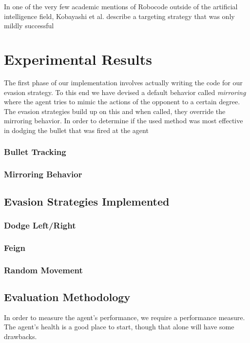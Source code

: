 \documentclass{article}
\theoremstyle{plain}
\theoremstyle{definition}
\theoremstyle{remark}
\begin{document}
In one of the very few academic mentions of Robocode outside of the artificial
intelligence field, Kobayashi et al. describe a targeting strategy that was
only mildly successful \cite{strategies}


\section{Experimental Results}

The first phase of our implementation involves actually writing the code for our evasion strategy. To this end we have devised a default behavior called \emph{mirroring} where the agent tries to mimic the actions of the opponent to a certain degree. The evasion strategies build up on this and when called, they override the mirroring behavior. In order to determine if the used method was most effective in dodging the bullet that was fired at the agent

\subsubsection*{Bullet Tracking}

\subsubsection*{Mirroring Behavior}

\subsection*{Evasion Strategies Implemented}

\subsubsection*{Dodge Left/Right}

\subsubsection*{Feign}

\subsubsection*{Random Movement}



\subsection*{Evaluation Methodology}
In order to measure the agent's performance, we require a performance measure. The agent's health is a good place to start, though that alone will have some drawbacks.\\
\end{document}
